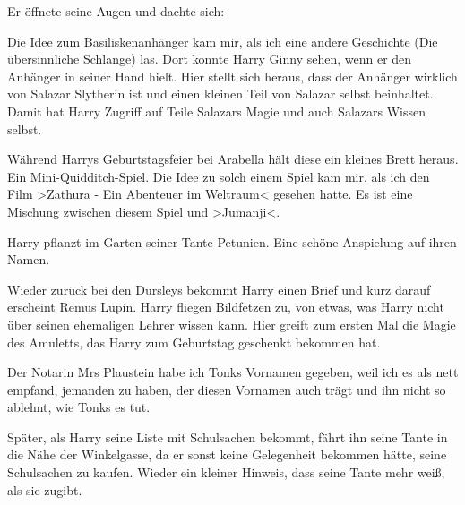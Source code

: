 Er öffnete seine Augen und dachte sich: 




\begin{kommentar}
Die Idee zum Basiliskenanhänger kam mir, als ich eine andere Geschichte (Die übersinnliche Schlange) las. Dort konnte Harry Ginny sehen, wenn er den Anhänger in seiner Hand hielt. Hier stellt sich heraus, dass der Anhänger wirklich von Salazar Slytherin ist und einen kleinen Teil von Salazar selbst beinhaltet. Damit hat Harry Zugriff auf Teile Salazars Magie und auch Salazars Wissen selbst.
\end{kommentar}

\begin{kommentar}
Während Harrys Geburtstagsfeier bei Arabella hält diese ein kleines Brett heraus. Ein Mini-Quidditch-Spiel. Die Idee zu solch einem Spiel kam mir, als ich den Film >Zathura - Ein Abenteuer im Weltraum< gesehen hatte. Es ist eine Mischung zwischen diesem Spiel und >Jumanji<.
\end{kommentar}

\begin{kommentar}
Harry pflanzt im Garten seiner Tante Petunien. Eine schöne Anspielung auf ihren Namen.
\end{kommentar}

\begin{kommentar}
Wieder zurück bei den Dursleys bekommt Harry einen Brief und kurz darauf erscheint Remus Lupin. Harry fliegen Bildfetzen zu, von etwas, was Harry nicht über seinen ehemaligen Lehrer wissen kann. Hier greift zum ersten Mal die Magie des Amuletts, das Harry zum Geburtstag geschenkt bekommen hat.
\end{kommentar}

\begin{kommentar}
Der Notarin Mrs Plaustein habe ich Tonks Vornamen gegeben, weil ich es als nett empfand, jemanden zu haben, der diesen Vornamen auch trägt und ihn nicht so ablehnt, wie Tonks es tut.
\end{kommentar}

\begin{kommentar}
Später, als Harry seine Liste mit Schulsachen bekommt, fährt ihn seine Tante in die Nähe der Winkelgasse, da er sonst keine Gelegenheit bekommen hätte, seine Schulsachen zu kaufen. Wieder ein kleiner Hinweis, dass seine Tante mehr weiß, als sie zugibt.
\end{kommentar}
